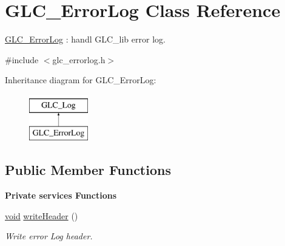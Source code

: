 \hypertarget{class_g_l_c___error_log}{\section{G\-L\-C\-\_\-\-Error\-Log Class Reference}
\label{class_g_l_c___error_log}
}


\hyperlink{class_g_l_c___error_log}{G\-L\-C\-\_\-\-Error\-Log} \-: handl G\-L\-C\-\_\-lib error log.  




{\ttfamily \#include $<$glc\-\_\-errorlog.\-h$>$}

Inheritance diagram for G\-L\-C\-\_\-\-Error\-Log\-:\begin{figure}[H]
\begin{center}
\leavevmode
\includegraphics[height=2.000000cm]{class_g_l_c___error_log}
\end{center}
\end{figure}
\subsection*{Public Member Functions}
\begin{Indent}{\bf Private services Functions}\par
\begin{DoxyCompactItemize}
\item 
\hyperlink{group___u_a_v_objects_plugin_ga444cf2ff3f0ecbe028adce838d373f5c}{void} \hyperlink{class_g_l_c___error_log_a4242e2a5faa792b7cf3f061ad095c0bc}{write\-Header} ()
\begin{DoxyCompactList}\small\item\em Write error Log header. \end{DoxyCompactList}\end{DoxyCompactItemize}
\end{Indent}
